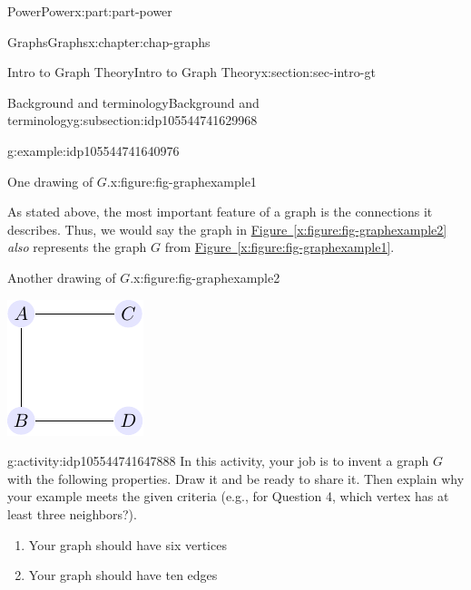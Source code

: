 \documentclass[oneside,10pt,]{book}
\newcommand{\xreffont}{\relax}
\numberwithin{equation}{section}
\begin{document}
\begin{partptx}{Power}{}{Power}{}{}{x:part:part-power}
\begin{chapterptx}{Graphs}{}{Graphs}{}{}{x:chapter:chap-graphs}
\begin{sectionptx}{Intro to Graph Theory}{}{Intro to Graph Theory}{}{}{x:section:sec-intro-gt}
\begin{subsectionptx}{Background and terminology}{}{Background and terminology}{}{}{g:subsection:idp105544741629968}
\begin{example}{}{g:example:idp105544741640976}
\begin{figureptx}{One drawing of \(G\).}{x:figure:fig-graphexample1}{}
\begin{image}{0.325}{0.35}{0.325}
\end{image}%
\tcblower
\end{figureptx}%
 As stated above, the most important feature of a graph is the connections it describes. Thus, we would say the graph in \hyperref[x:figure:fig-graphexample2]{Figure~{\xreffont\ref{x:figure:fig-graphexample2}}} \emph{also} represents the graph \(G\) from \hyperref[x:figure:fig-graphexample1]{Figure~{\xreffont\ref{x:figure:fig-graphexample1}}}. \begin{figureptx}{Another drawing of \(G\).}{x:figure:fig-graphexample2}{}%
\begin{image}{0.325}{0.35}{0.325}%
\includegraphics[width=\linewidth]{images/graph02.pdf}
\end{image}%
\tcblower
\end{figureptx}%
%
\end{example}
\begin{activity}{}{g:activity:idp105544741647888}%
In this activity, your job is to invent a graph \(G\) with the following properties. Draw it and be ready to share it. Then explain why your example meets the given criteria (e.g., for Question 4, which vertex has at least three neighbors?).%
%
\begin{enumerate}
\item{}Your graph should have six vertices%
\item{}Your graph should have ten edges%

\end{enumerate}
\end{activity}
\end{subsectionptx}
\end{sectionptx}
\end{chapterptx}
\end{partptx}
\end{document}
